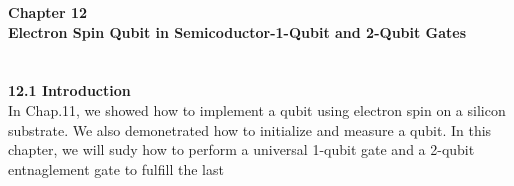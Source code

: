 \documentclass{article}
\begin{document}
\medskip
\textbf{\Large Chapter 12\\
Electron Spin Qubit in Semicoductor-1-Qubit and 2-Qubit Gates}\\\\\\
\medskip
\textbf{\large 12.1 Introduction}\\
In Chap.11, we showed how to implement a qubit using electron spin on a silicon
substrate. We also demonetrated how to initialize and measure a qubit. In this chapter,
we will sudy how to perform a universal 1-qubit gate and a 2-qubit entnaglement gate to fulfill
the last
\end{document}
